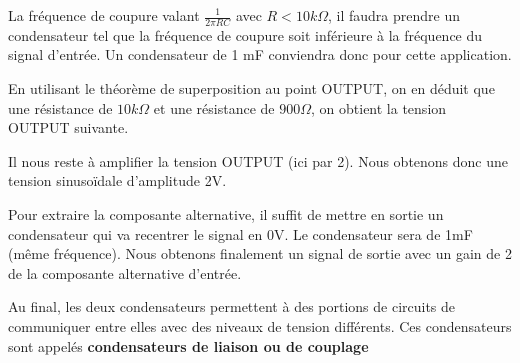 
La fréquence de coupure valant $\frac{1}{2\pi RC}$ avec $ R < 10 k\Omega$, il faudra prendre un condensateur tel que la fréquence de coupure soit inférieure à la fréquence du signal d'entrée. \n
Un condensateur de 1 mF conviendra donc pour cette application.\n

En utilisant le théorème de superposition au point OUTPUT, on en déduit que une résistance de $10 k\Omega$ et une résistance de $ 900 \Omega$, on obtient la tension OUTPUT suivante.


Il nous reste à amplifier la tension OUTPUT (ici par 2). Nous obtenons donc une tension sinusoïdale d'amplitude 2V. \n


Pour extraire la composante alternative, il suffit de mettre en sortie un condensateur qui va recentrer le signal en 0V.
Le condensateur sera de 1mF (même fréquence). \n
Nous obtenons finalement un signal de sortie avec un gain de 2 de la composante alternative d'entrée.\n

Au final, les deux condensateurs permettent à des portions de circuits de communiquer entre elles avec des niveaux de tension différents. Ces condensateurs sont appelés \textbf{condensateurs de liaison ou de couplage}






